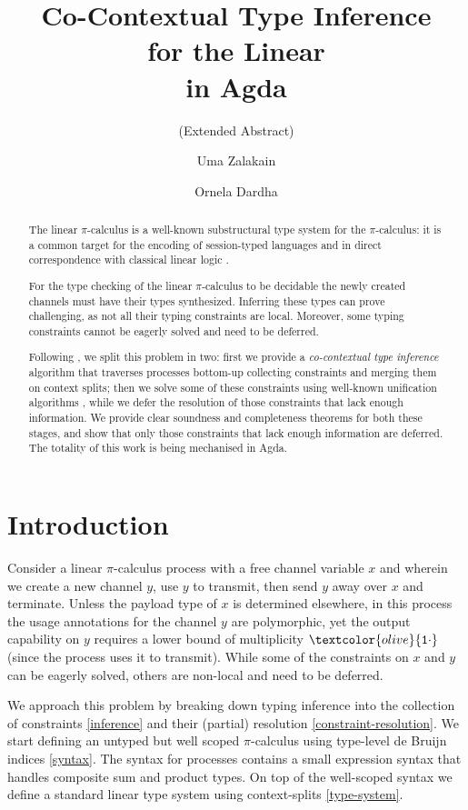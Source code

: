 \documentclass[sigplan,screen,review]{acmart}
\title
[Co-Contextual Type Inference for the Linear \Picalc{} in Agda]
{Co-Contextual Type Inference \\ for the Linear \Picalc{} \\ in Agda}
\subtitle{(Extended Abstract)}
\author{Uma Zalakain}
\affiliation{University of Glasgow}
\author{Ornela Dardha}
\affiliation{University of Glasgow}
\newcommand{\picalc}{$\pi$-calculus}
\newcommand{\constr}[1]{\textcolor{olive}{\mathtt{#1}}}
\newcommand{\tone}{\constr{1\cdot}}
\begin{document}
\begin{abstract}
  The linear \picalc{} is a well-known substructural type system for the \picalc{}:
  it is a common target for the encoding of session-typed languages \cite{DardhaGS17}
  and in direct correspondence with classical linear logic .

  For the type checking of the linear \picalc{} to be decidable the newly created channels must have their types synthesized.
  Inferring these types can prove challenging, as not all their typing constraints are local.
  Moreover, some typing constraints cannot be eagerly solved and need to be deferred.

  Following \cite{Padovani15}, we split this problem in two: first we provide a \emph{co-contextual type inference} \cite{ErdwegBKKM15} algorithm that traverses processes bottom-up collecting constraints and merging them on context splits; then we solve some of these constraints using well-known unification algorithms \cite{McBride03}, while we defer the resolution of those constraints that lack enough information.
  We provide clear soundness and completeness theorems for both these stages, and show that only those constraints that lack enough information are deferred.
  The totality of this work is being mechanised in Agda.
\end{abstract}


\maketitle

\section{Introduction}\label{introduction}

Consider a linear \picalc{} process with a free channel variable $x$ and wherein we create a new channel $y$, use $y$ to transmit, then send $y$ away over $x$ and terminate.
Unless the payload type of $x$ is determined elsewhere, in this process the usage annotations for the channel $y$ are polymorphic, yet the output capability on $y$ requires a lower bound of multiplicity $\tone$ (since the process uses it to transmit).
While some of the constraints on $x$ and $y$ can be eagerly solved, others are non-local and need to be deferred.

We approach this problem by breaking down typing inference into the collection of constraints \autoref{inference} and their (partial) resolution \autoref{constraint-resolution}.
We start defining an untyped but well scoped \picalc{} using type-level de Bruijn \cite{deBruijn72} indices \autoref{syntax}.
The syntax for processes contains a small expression syntax that handles composite sum and product types.
On top of the well-scoped syntax we define a standard linear type system using context-splits \autoref{type-system}.
\end{document}
